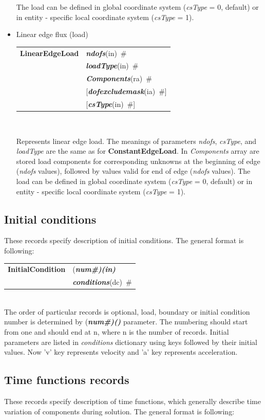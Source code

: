 \documentclass[a4paper]{article}
\makeatletter
\newcommand{\param}[1]{{\em #1}}
\newcommand{\fieldVal}[2]{\mbox{({\it\bf{#1}\#)\tiny (#2)}}}
\newcommand{\keywordnotype}[1]{\mbox{{\it{\bf{#1}}}}}
\newcommand{\keyword}[2]{\mbox{{\keywordnotype{#1}\tiny (#2)}}}
\newcommand{\entKeywordInst}[1]{\mbox{{\bf{{#1}}}}}
\newcommand{\field}[2]{\mbox{\keyword{#1}{#2}~\#}}
\newcommand{\optField}[2]{\mbox{[\field{#1}{#2}]}}
\newenvironment{record}[1][]{\begin{tabular}{|ll}}{\end{tabular}\\}
\newcommand{\recentry}[2]{{#1}&{#2}\\}
\newcounter{rcc}
\newenvironment{record}[1][\textwidth]{\setcounter{rcc}{0}\begin{tabular*}{#1}{|ll@{\extracolsep{\fill}}r}}{\end{tabular*}\\}
\newcommand{\recentry}[2]{\ifthenelse{\value{rcc}>0}{&$\backslash$ \\}{\setcounter{rcc}{1}}{#1}&{#2}}
\makeatother
\begin{document}
\begin{itemize}
The load can be defined in global coordinate system (\param{csType} =
0, default) or in entity - specific local coordinate system
(\param{csType} = 1).
\item Linear edge flux (load)

\begin{record}[0.9\textwidth]
\recentry{\entKeywordInst{LinearEdgeLoad}}{\field{ndofs}{in}} \recentry{}{\field{loadType}{in}}
\recentry{}{\field{Components}{ra}} \recentry{}{\optField{dofexcludemask}{ia}} \recentry{}{\optField{csType}{in}}
\end{record}

Represents linear edge load. The meanings of parameters \param{ndofs},
\param{csType}, and \param{loadType} are the same as for
\entKeywordInst{ConstantEdgeLoad}. In \param{Components}
array are stored load components for corresponding unknowns at the
beginning of edge (\param{ndofs} values), followed by values valid for
end of edge (\param{ndofs} values). The load can be defined in global coordinate system (\param{csType} =
0, default) or in entity - specific local coordinate system
(\param{csType} = 1).
\end{itemize}


\subsection{Initial conditions}
\label{_InitialConditions}
These records specify description of initial conditions. The general format is
following:

\noindent
\begin{record}
  \recentry{\entKeywordInst{InitialCondition}}{\fieldVal{num}{in}}
  \recentry{}{\field{conditions}{dc}}
\end{record}
The order of particular  records is optional, load, boundary or initial condition number is determined by \fieldVal{num}{} parameter.
The numbering should start from one and should end at n, where n is the number of records.
Initial parameters are listed in \param{conditions} dictionary using keys followed by their initial values.
Now 'v' key represents velocity and 'a' key represents acceleration.



\subsection{Time functions records}
\label{_TimeFunctionsRecords}
These records specify description of time functions, which generally describe
time variation of components during solution. The  general format is
following:
\end{document}
